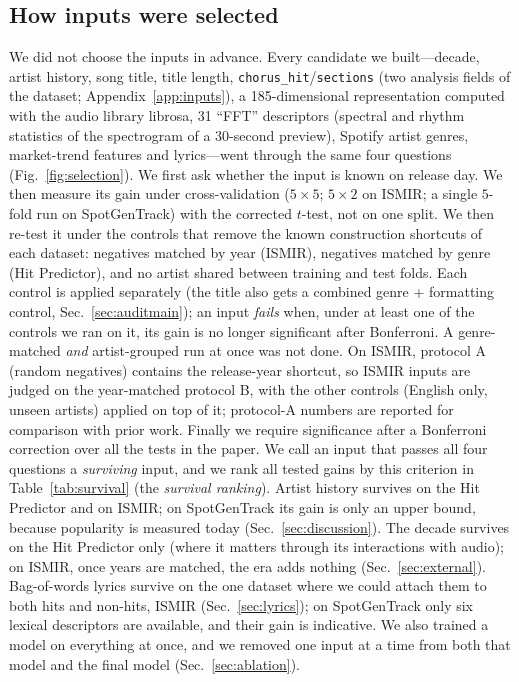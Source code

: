 \documentclass[conference]{IEEEtran}
\begin{document}
\subsection{How inputs were selected}\label{sec:selection}

We did not choose the inputs in advance. Every candidate we built---decade, artist history, song title,
title length, \texttt{chorus\_hit}/\texttt{sections} (two analysis fields of the dataset; Appendix~\ref{app:inputs}), a
185-dimensional representation computed with the audio library librosa, 31 ``FFT'' descriptors (spectral and
rhythm statistics of the spectrogram of a 30-second preview), Spotify artist genres, market-trend features and lyrics---went through the same four
questions (Fig.~\ref{fig:selection}). We first ask whether the input is known on release day. We then
measure its gain under cross-validation ($5{\times}5$; $5{\times}2$ on ISMIR; a single $5$-fold run on
SpotGenTrack) with the corrected $t$-test, not on one split. We
then re-test it under the controls that remove the known construction shortcuts of each dataset: negatives
matched by year (ISMIR), negatives matched by genre (Hit Predictor), and no artist shared between training
and test folds. Each control is applied separately (the title also gets a combined genre + formatting control,
Sec.~\ref{sec:auditmain}); an input \emph{fails} when, under at least one of the controls we ran on it, its gain is
no longer significant after Bonferroni. A genre-matched \emph{and} artist-grouped run at once was not done. On ISMIR, protocol A
(random negatives) contains the release-year shortcut, so ISMIR inputs are judged on the year-matched protocol B,
with the other controls (English only, unseen artists) applied on top of it; protocol-A numbers are reported for
comparison with prior work. Finally we require significance after a
Bonferroni correction over all the tests in the paper. We call an input that passes all four questions a \emph{surviving} input, and we rank all tested gains
by this criterion in Table~\ref{tab:survival} (the \emph{survival ranking}). Artist history survives on the Hit
Predictor and on ISMIR; on SpotGenTrack its gain is only an upper bound, because popularity is measured today
(Sec.~\ref{sec:discussion}). The decade survives on the Hit Predictor only (where it matters through its interactions with audio);
on ISMIR, once years are matched, the era adds nothing (Sec.~\ref{sec:external}). Bag-of-words lyrics survive on the one
dataset where we could attach them to both hits and non-hits, ISMIR (Sec.~\ref{sec:lyrics}); on SpotGenTrack only
six lexical descriptors are available, and their gain is indicative. We also trained
a model on everything at once, and we removed one input at a time from both that model and the final model
(Sec.~\ref{sec:ablation}).
\end{document}
